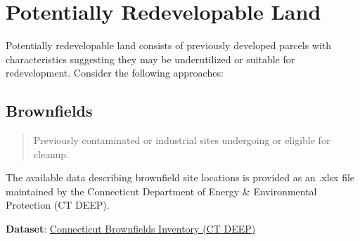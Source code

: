 \documentclass[
  letterpaper,
  DIV=11,
  numbers=noendperiod]{scrreprt}
\begin{document}
\section{Potentially Redevelopable
Land}\label{potentially-redevelopable-land}

Potentially redevelopable land consists of previously developed parcels
with characteristics suggesting they may be underutilized or suitable
for redevelopment. Consider the following approaches:

\subsection{\texorpdfstring{\textbf{Brownfields}}{Brownfields}}\label{brownfields}

\begin{quote}
Previously contaminated or industrial sites undergoing or eligible for
cleanup.
\end{quote}

The available data describing brownfield site locations is provided as
an .xlsx file maintained by the Connecticut Department of Energy \&
Environmental Protection (CT DEEP).

\textbf{Dataset}:
\href{https://portal.ct.gov/deep/remediation--site-clean-up/brownfields/brownfields-site-inventory}{Connecticut
Brownfields Inventory (CT DEEP)}
\end{document}
